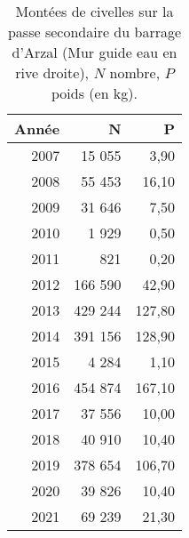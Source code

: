 \begin{table}[htbp]
\centering
\begin{tabular}{rrr}
  \hline
Année & N & P \\ 
  \hline
2007 & 15 055 & 3,90 \\ 
  2008 & 55 453 & 16,10 \\ 
  2009 & 31 646 & 7,50 \\ 
  2010 & 1 929 & 0,50 \\ 
  2011 & 821 & 0,20 \\ 
  2012 & 166 590 & 42,90 \\ 
  2013 & 429 244 & 127,80 \\ 
  2014 & 391 156 & 128,90 \\ 
  2015 & 4 284 & 1,10 \\ 
  2016 & 454 874 & 167,10 \\ 
  2017 & 37 556 & 10,00 \\ 
  2018 & 40 910 & 10,40 \\ 
  2019 & 378 654 & 106,70 \\ 
  2020 & 39 826 & 10,40 \\ 
  2021 & 69 239 & 21,30 \\ 
   \hline
\end{tabular}
\caption{Montées de civelles sur la passe secondaire du barrage d'Arzal (Mur guide eau en rive droite), $N$ nombre,
		$P$ poids (en kg).} 
\label{table_civelle_12}
\end{table}

